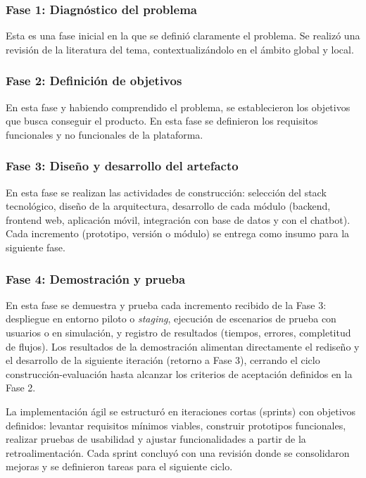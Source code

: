   \subsubsection{Fase 1: Diagnóstico del problema} Esta es una fase inicial en la que se definió claramente el problema. Se realizó una revisión de la literatura del tema, contextualizándolo en el ámbito global y local.

  \subsubsection{Fase 2: Definición de objetivos} En esta fase y habiendo comprendido el problema, se establecieron los objetivos que busca conseguir el producto. En esta fase se definieron los requisitos funcionales y no funcionales de la plataforma.

  \subsubsection{Fase 3: Diseño y desarrollo del artefacto} En esta fase se realizan las actividades de construcción: selección del stack tecnológico, diseño de la arquitectura, desarrollo de cada módulo (backend, frontend web, aplicación móvil, integración con base de datos y con el chatbot). Cada incremento (prototipo, versión o módulo) se entrega como insumo para la siguiente fase.

  \subsubsection{Fase 4: Demostración y prueba} En esta fase se demuestra y prueba cada incremento recibido de la Fase 3: despliegue en entorno piloto o \textit{staging}, ejecución de escenarios de prueba con usuarios o en simulación, y registro de resultados (tiempos, errores, completitud de flujos). Los resultados de la demostración alimentan directamente el rediseño y el desarrollo de la siguiente iteración (retorno a Fase 3), cerrando el ciclo construcción-evaluación hasta alcanzar los criterios de aceptación definidos en la Fase 2.

  La implementación ágil se estructuró en iteraciones cortas (sprints) con objetivos definidos: levantar requisitos mínimos viables, construir prototipos funcionales, realizar pruebas de usabilidad y ajustar funcionalidades a partir de la retroalimentación. Cada sprint concluyó con una revisión donde se consolidaron mejoras y se definieron tareas para el siguiente ciclo.

